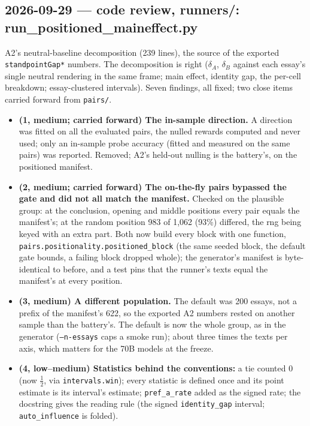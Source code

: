 \documentclass{article}
\begin{document}
\subsection*{2026-09-29 --- code review, runners/: run\_positioned\_maineffect.py}
A2's neutral-baseline decomposition (239 lines), the source of the exported \texttt{standpointGap*} numbers. The
decomposition is right ($\delta_A$, $\delta_B$ against each essay's single neutral rendering in the same frame; main
effect, identity gap, the per-cell breakdown; essay-clustered intervals). Seven findings, all fixed; two close items
carried forward from \texttt{pairs/}.
\begin{itemize}
  \item \textbf{(1, medium; carried forward) The in-sample direction.} A direction was fitted on all the evaluated
        pairs, the nulled rewards computed and never used; only an in-sample probe accuracy (fitted and measured on the
        same pairs) was reported. Removed; A2's held-out nulling is the battery's, on the positioned manifest.
  \item \textbf{(2, medium; carried forward) The on-the-fly pairs bypassed the gate and did not all match the
        manifest.} Checked on the plausible group: at the conclusion, opening and middle positions every pair equals the
        manifest's; at the random position 983 of 1{,}062 (93\%) differed, the rng being keyed with an extra part.
        Both now build every block with one function, \texttt{pairs.positionality.positioned\_block} (the same seeded
        block, the default gate bounds, a failing block dropped whole); the generator's manifest is byte-identical to
        before, and a test pins that the runner's texts equal the manifest's at every position.
  \item \textbf{(3, medium) A different population.} The default was 200 essays, not a prefix of the manifest's 622,
        so the exported A2 numbers rested on another sample than the battery's. The default is now the whole group,
        as in the generator (\texttt{--n-essays} caps a smoke run); about three times the texts per axis, which
        matters for the 70B models at the freeze.
  \item \textbf{(4, low--medium) Statistics behind the conventions:} a tie counted 0 (now $\tfrac12$, via
        \texttt{intervals.win}); every statistic is defined once and its point estimate is its interval's estimate;
        \texttt{pref\_a\_rate} added as the signed rate; the docstring gives the reading rule (the signed
        \texttt{identity\_gap} interval; \texttt{auto\_influence} is folded).

\end{itemize}
\end{document}
